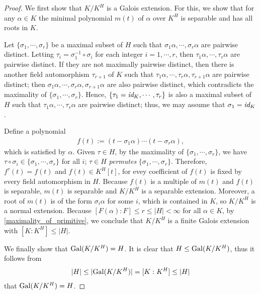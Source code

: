 \begin{proof}
    We first show that $K/K^H$ is a Galois extension.
    For this, we show that for any $\alpha\in K$ the minimal polynomial $m(t)$ of $\alpha$ over $K^H$ is separable and has all roots in $K$.
    
    \color{magenta}Let $\{\sigma_1, \cdots, \sigma_r\}$ be a maximal subset of $H$ such that $\sigma_1\alpha, \cdots, \sigma_r\alpha$ are pairwise distinct. \color{black}
    Letting $\tau_i=\sigma_1^{-1}\circ\sigma_i$ for each integer $i=1, \cdots, r$, then $\tau_1\alpha, \cdots, \tau_r\alpha$ are pairwise distinct.
    If they are not maximally pairwise distinct, then there is another field automorphism $\tau_{r+1}$ of $K$ such that $\tau_1\alpha, \cdots, \tau_r\alpha, \tau_{r+1}\alpha$ are pairwise distinct; then $\sigma_1\alpha, \cdots, \sigma_r\alpha, \sigma_{r+1}\alpha$ are also pairwise distinct, which contradicts the maximality of $\{\sigma_1, \cdots, \sigma_r\}$.
    Hence, $\{\tau_1=\textit{id}_{K}, \cdots, \tau_r\}$ is also a maximal subset of $H$ such that $\tau_1\alpha, \cdots, \tau_r\alpha$ are pairwise distinct; thus, we may assume that $\sigma_1=\textit{id}_{K}$.

    Define a polynomial
    \begin{align*}
        f(t):=(t-\sigma_1\alpha)\cdots(t-\sigma_r\alpha),
    \end{align*}
    which is satisfied by $\alpha$.
    Given $\tau\in H$, by the maximality of $\{\sigma_1, \cdots, \sigma_r\}$, we have $\tau\circ\sigma_i\in\{\sigma_1, \cdots, \sigma_r\}$ for all $i$; $\tau\in H$ \textit{permutes} $\{\sigma_1, \cdots, \sigma_r\}$.
    Therefore, $f^\tau(t)=f(t)$ and $f(t)\in K^H[t]$, for evey coefficient of $f(t)$ is fixed by every field automorphism in $H$.
    Because $f(t)$ is a multiple of $m(t)$ and $f(t)$ is separable, $m(t)$ is separable and $K/K^H$ is a separable extension.
    Moreover, a root of $m(t)$ is of the form $\sigma_i\alpha$ for some $i$, which is contained in $K$, so $K/K^H$ is a normal extension.
    Because $[F(\alpha): F]\leq r\leq |H|<\infty$ for all $\alpha\in K$, by \cref{maximality_of_primitive}, we conclude that $K/K^H$ is a finite Galois extension with $[K:K^H]\leq |H|$.

    We finally show that ${\textrm{Gal}({K/K^H})}=H$.
    It is clear that $H\leq{\textrm{Gal}({K/K^H})}$, thus it follows from
    \begin{align*}
        |H|\leq|{\textrm{Gal}({K/K^H})}|=[K:K^H]\leq|H|
    \end{align*}
    that ${\textrm{Gal}({K/K^H})}=H$.
\end{proof}